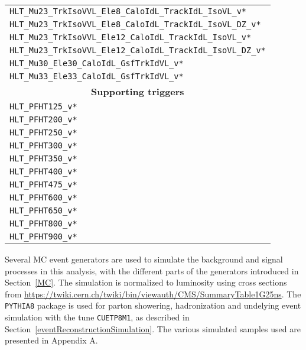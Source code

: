 \begin{table}[ht!]
\begin{center}
\begin{tabular}{ l}
        \texttt{HLT\_Mu23\_TrkIsoVVL\_Ele8\_CaloIdL\_TrackIdL\_IsoVL\_v*}    \\ 
        \texttt{HLT\_Mu23\_TrkIsoVVL\_Ele8\_CaloIdL\_TrackIdL\_IsoVL\_DZ\_v*} \\
        \texttt{HLT\_Mu23\_TrkIsoVVL\_Ele12\_CaloIdL\_TrackIdL\_IsoVL\_v*}    \\ 
        \texttt{HLT\_Mu23\_TrkIsoVVL\_Ele12\_CaloIdL\_TrackIdL\_IsoVL\_DZ\_v*}    \\ 
        \texttt{HLT\_Mu30\_Ele30\_CaloIdL\_GsfTrkIdVL\_v*}            \\
        \texttt{HLT\_Mu33\_Ele33\_CaloIdL\_GsfTrkIdVL\_v*}            \\
        \hline 
        \multicolumn{1}{c}{\textbf{Supporting triggers}} \\
        \hline 
        \texttt{HLT\_PFHT125\_v*}                       \\
        \texttt{HLT\_PFHT200\_v*}                       \\
        \texttt{HLT\_PFHT250\_v*}                       \\
        \texttt{HLT\_PFHT300\_v*}                       \\
        \texttt{HLT\_PFHT350\_v*}                       \\
        \texttt{HLT\_PFHT400\_v*}                       \\
        \texttt{HLT\_PFHT475\_v*}                       \\
        \texttt{HLT\_PFHT600\_v*}                       \\
        \texttt{HLT\_PFHT650\_v*}                       \\
        \texttt{HLT\_PFHT800\_v*}                       \\
        \texttt{HLT\_PFHT900\_v*}                       \\
\hline\hline
\end{tabular}
\end{center}
\end{table}                                                                                                          

Several MC event generators are used to simulate the background and signal processes in this analysis, with the different parts of the generators introduced in Section~\ref{MC}. 
The simulation is normalized to luminosity using cross sections from \url{https://twiki.cern.ch/twiki/bin/viewauth/CMS/SummaryTable1G25ns}.
The \texttt{PYTHIA8} \cite{Sjostrand:2006za} package is used for parton showering, hadronization and undelying event simulation with the tune \texttt{CUETP8M1}, as described in Section~\ref{eventReconstructionSimulation}.
The various simulated samples used are presented in Appendix A.  

